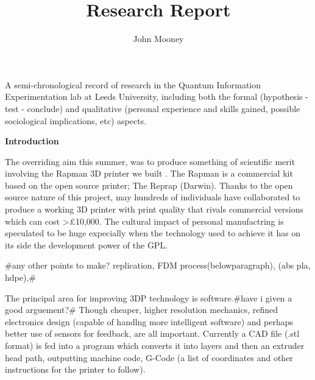 \documentclass{letter}
\newcommand{\section}[1]{\medskip\bigskip

\noindent\textbf{\LARGE #1}}
\newenvironment{tmparmod}[3]{\begin{list}{}{\setlength{\topsep}{0pt}\setlength{\leftmargin}{#1}\setlength{\rightmargin}{#2}\setlength{\parindent}{#3}\setlength{\listparindent}{\parindent}\setlength{\itemindent}{\parindent}\setlength{\parsep}{\parskip}} \item[]}{\end{list}}
\begin{document}
\title{Research Report}\author{John Mooney}\maketitle

\begin{center}
  \begin{tmparmod}{0pt}{0pt}{1em}
    \begin{tmparmod}{0pt}{2cm}{0pt}
      \begin{tmparmod}{2cm}{0pt}{0pt}
        A semi-chronological record of research in the Quantum Information
        Experimentation lab at Leeds University, including both the formal
        (hypothesis - test - conclude) and qualitative (personal experience
        and skills gained, possible sociological implications, etc) aspects. 
      \end{tmparmod}
    \end{tmparmod}
  \end{tmparmod}
\end{center}





{\tableofcontents}

{\newpage}

\section{Introduction}

The overriding aim this summer, was to produce something of scientific merit
involving the Rapman 3D printer we built . The Rapman is a commercial kit
based on the open source printer; The Reprap (Darwin). Thanks to the open
source nature of this project, may hundreds of individuals have collaborated
to produce a working 3D printer with print quality that rivals commercial
versions which can cost >{\pounds}10,000. The cultural impact of personal
manufactring is speculated to be huge  expecially when the technology used to
achieve it has on its side the development power of the GPL{\nobreak}.

\#any other points to make? replication, FDM process(belowparagraph), (abs
pla, hdpe),\#

The principal area for improving 3DP technology is software.\#have i given a
good arguement?\# Though cheaper, higher resolution mechanics, refined
electronics design (capable of handlng more intelligent software) and perhaps
better use of sensors for feedback, are all important. Currently a CAD file
(.stl format) is fed into a program which converts it into layers and then an
extruder head path, outputting machine code, G-Code (a list of coordinates and
other instructions for the printer to follow).
\end{document}

